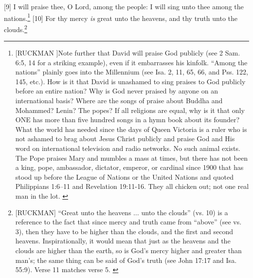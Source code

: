 [9] \textcolor[rgb]{0.00,0.00,1.00}{I will praise thee, O Lord, among the people: I will sing unto thee among the nations.}\footnote{[RUCKMAN ]Note further that David will praise God publicly (see 2 Sam. 6:5, 14 for a striking example), even if it embarrasses his kinfolk. “Among the nations” plainly goes into the Millennium (see Isa. 2, 11, 65, 66, and Pss. 122, 145, etc.). How is it that David is unashamed to sing praises to God publicly before an entire nation? Why is God never praised by anyone on an international basis? Where are the songs of praise about Buddha and Mohammed? Lenin? The popes? If all religions are equal, why is it that only ONE has more than five hundred songs in a hymn book about its founder? What the world has needed since the days of Queen Victoria is a ruler who is not ashamed to brag about Jesus Christ publicly and praise God and His word on international television and radio networks. No such animal exists. The Pope praises Mary and mumbles a mass at times, but there has not been a king, pope, ambassador, dictator, emperor, or cardinal since 1900 that has stood up before the League of Nations or the United Nations and quoted Philippians 1:6--11 and Revelation 19:11-16. They all chicken out; not one real man in the lot. \cite{Ruckman1992Psalms} }
[10] \textcolor[rgb]{0.00,0.00,1.00}{For thy mercy \emph{is} great unto the heavens, and thy truth unto the clouds.}\footnote{[RUCKMAN] “Great unto the heavens $\hdots$ unto the clouds” (vs. 10) is a reference to the fact that since mercy and truth came from “above” (see vs. 3), then they have to be higher than the clouds, and the first and second heavens. Inspirationally, it would mean that just as the heavens and the clouds are higher than the earth, so is God’s mercy higher and greater than man’s; the same thing can be said of God’s truth (see John 17:17 and Isa. 55:9). Verse 11 matches verse 5. \cite{Ruckman1992Psalms} }
